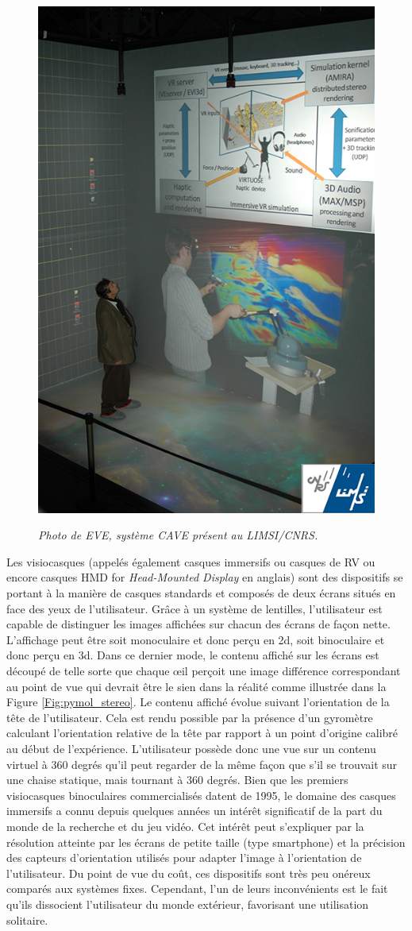 \begin{figure}
  \centering
  {\includegraphics[width=.35\linewidth]{./figures/ch2/eve_cave_system}}
    \caption{{\it Photo de EVE, système CAVE présent au LIMSI/CNRS.}}
  \label{Fig:eve_cave_system}
  \hspace{0.3cm}
\end{figure}

 \label{dispo_mobil}

Les visiocasques (appelés également casques immersifs ou casques de RV ou encore casques HMD for \textit{Head-Mounted Display} en anglais) sont des dispositifs se portant à la manière de casques standards et composés de deux écrans situés en face des yeux de l'utilisateur. Grâce à un système de lentilles, l'utilisateur est capable de distinguer les images affichées sur chacun des écrans de façon nette. L'affichage peut être soit monoculaire et donc perçu en 2d, soit binoculaire et donc perçu en 3d. Dans ce dernier mode, le contenu affiché sur les écrans est découpé de telle sorte que chaque œil perçoit une image différence correspondant au point de vue qui devrait être le sien dans la réalité comme illustrée dans la Figure \ref{Fig:pymol_stereo}. Le contenu affiché évolue suivant l'orientation de la tête de l'utilisateur. Cela est rendu possible par la présence d'un gyromètre calculant l'orientation relative de la tête par rapport à un point d'origine calibré au début de l'expérience. L'utilisateur possède donc une vue sur un contenu virtuel à 360 degrés qu'il peut regarder de la même façon que s'il se trouvait sur une chaise statique, mais tournant à 360 degrés. Bien que les premiers visiocasques binoculaires commercialisés datent de 1995, le domaine des casques immersifs a connu depuis quelques années un intérêt significatif de la part du monde de la recherche et du jeu vidéo. Cet intérêt peut s'expliquer par la résolution atteinte par les écrans de petite taille (type smartphone) et la précision des capteurs d'orientation utilisés pour adapter l'image à l'orientation de l'utilisateur. Du point de vue du coût, ces dispositifs sont très peu onéreux comparés aux systèmes fixes. Cependant, l'un de leurs inconvénients est le fait qu'ils dissocient l'utilisateur du monde extérieur, favorisant une utilisation solitaire.


